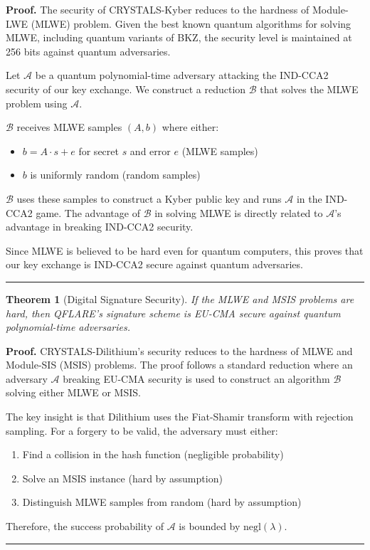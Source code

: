 \documentclass[journal,onecolumn]{IEEEtran}
\newtheorem{theorem}{Theorem}
\newenvironment{proof}[1][Proof]{\noindent\textbf{#1.} }{\ \rule{0.5em}{0.5em}}
\begin{document}
\begin{proof}
The security of CRYSTALS-Kyber reduces to the hardness of Module-LWE (MLWE) problem. Given the best known quantum algorithms for solving MLWE, including quantum variants of BKZ, the security level is maintained at 256 bits against quantum adversaries.

Let $\mathcal{A}$ be a quantum polynomial-time adversary attacking the IND-CCA2 security of our key exchange. We construct a reduction $\mathcal{B}$ that solves the MLWE problem using $\mathcal{A}$.

$\mathcal{B}$ receives MLWE samples $(A, b)$ where either:
\begin{itemize}
\item $b = A \cdot s + e$ for secret $s$ and error $e$ (MLWE samples)
\item $b$ is uniformly random (random samples)
\end{itemize}

$\mathcal{B}$ uses these samples to construct a Kyber public key and runs $\mathcal{A}$ in the IND-CCA2 game. The advantage of $\mathcal{B}$ in solving MLWE is directly related to $\mathcal{A}$'s advantage in breaking IND-CCA2 security.

Since MLWE is believed to be hard even for quantum computers, this proves that our key exchange is IND-CCA2 secure against quantum adversaries.
\end{proof}

\begin{theorem}[Digital Signature Security]
If the MLWE and MSIS problems are hard, then QFLARE's signature scheme is EU-CMA secure against quantum polynomial-time adversaries.
\end{theorem}

\begin{proof}
CRYSTALS-Dilithium's security reduces to the hardness of MLWE and Module-SIS (MSIS) problems. The proof follows a standard reduction where an adversary $\mathcal{A}$ breaking EU-CMA security is used to construct an algorithm $\mathcal{B}$ solving either MLWE or MSIS.

The key insight is that Dilithium uses the Fiat-Shamir transform with rejection sampling. For a forgery to be valid, the adversary must either:
\begin{enumerate}
\item Find a collision in the hash function (negligible probability)
\item Solve an MSIS instance (hard by assumption)
\item Distinguish MLWE samples from random (hard by assumption)
\end{enumerate}

Therefore, the success probability of $\mathcal{A}$ is bounded by $\text{negl}(\lambda)$.
\end{proof}
\end{document}
